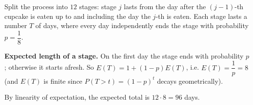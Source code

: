 Split the process into $12$ stages: stage $j$ lasts from the day after the $(j-1)$-th cupcake is eaten up to and including the day the $j$-th is eaten. Each stage lasts a number $T$ of days, where every day independently ends the stage with probability $p=\dfrac18$.

\textbf{Expected length of a stage.} On the first day the stage ends with probability $p$; otherwise it starts afresh. So $E(T)=1+(1-p)E(T)$, i.e. $E(T)=\dfrac1p=8$ (and $E(T)$ is finite since $P(T>t)=(1-p)^t$ decays geometrically).

By linearity of expectation, the expected total is $12\cdot8=\boxed{96}$ days.
